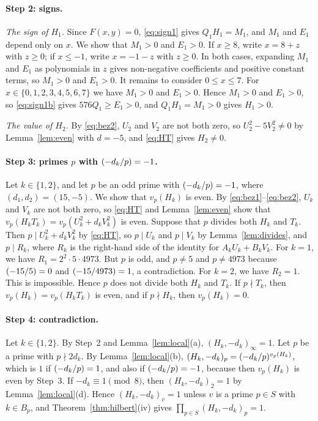 \documentclass[11pt]{article}
\newcommand{\leg}[2]{\mathchoice{\biggl(\dfrac{#1}{#2}\biggr)}{(#1/#2)}{(#1/#2)}{(#1/#2)}}
\begin{document}
\paragraph{Step 2: signs.} \emph{The sign of $H_{1}$.} Since $F(x,y)=0$, \eqref{eq:sign1} gives $Q_{1}H_{1}=M_{1}$, and $M_{1}$ and $E_{1}$ depend only on $x$. We show that $M_{1}>0$ and $E_{1}>0$. If $x\geq8$, write $x=8+z$ with $z\geq0$; if $x\leq-1$, write $x=-1-z$ with $z\geq0$. In both cases, expanding $M_{1}$ and $E_{1}$ as polynomials in $z$ gives non-negative coefficients and positive constant terms, so $M_{1}>0$ and $E_{1}>0$. It remains to consider $0\leq x\leq7$. For $x\in\{0,1,2,3,4,5,6,7\}$ we have $M_{1}>0$ and $E_{1}>0$. Hence $M_{1}>0$ and $E_{1}>0$, so \eqref{eq:sign1b} gives $576Q_{1}\geq E_{1}>0$, and $Q_{1}H_{1}=M_{1}>0$ gives $H_{1}>0$.

\emph{The value of $H_{2}$.} By \eqref{eq:bez2}, $U_{2}$ and $V_{2}$ are not both zero, so $U_{2}^2-5V_{2}^2\neq0$ by Lemma~\ref{lem:even} with $d=-5$, and \eqref{eq:HT} gives $H_{2}\neq0$.

\paragraph{Step 3: primes $p$ with $\leg{-d_k}{p}=-1$.} Let $k\in\{1,2\}$, and let $p$ be an odd prime with $\leg{-d_k}{p}=-1$, where $(d_{1},d_{2})=(15,-5)$. We show that $v_p(H_k)$ is even. By \eqref{eq:bez1}--\eqref{eq:bez2}, $U_k$ and $V_k$ are not both zero, so \eqref{eq:HT} and Lemma~\ref{lem:even} show that $v_p(H_kT_k)=v_p(U_k^2+d_kV_k^2)$ is even. Suppose that $p$ divides both $H_k$ and $T_k$. Then $p\mid U_k^2+d_kV_k^2$ by \eqref{eq:HT}, so $p\mid U_k$ and $p\mid V_k$ by Lemma~\ref{lem:divides}, and $p\mid R_k$, where $R_k$ is the right-hand side of the identity for $A_kU_k+B_kV_k$. For $k=1$, we have $R_{1}=2^{2}\cdot 5\cdot 4973$. But $p$ is odd, and $p\neq5$ and $p\neq4973$ because $\leg{-15}{5}=0$ and $\leg{-15}{4973}=1$, a contradiction. For $k=2$, we have $R_{2}=1$. This is impossible. Hence $p$ does not divide both $H_k$ and $T_k$. If $p\nmid T_k$, then $v_p(H_k)=v_p(H_kT_k)$ is even, and if $p\nmid H_k$, then $v_p(H_k)=0$.

\paragraph{Step 4: contradiction.} Let $k\in\{1,2\}$. By Step~2 and Lemma~\ref{lem:local}(a), $(H_k,-d_k)_\infty=1$. Let $p$ be a prime with $p\nmid2d_k$. By Lemma~\ref{lem:local}(b), $(H_k,-d_k)_p=\leg{-d_k}{p}^{v_p(H_k)}$, which is $1$ if $\leg{-d_k}{p}=1$, and also if $\leg{-d_k}{p}=-1$, because then $v_p(H_k)$ is even by Step~3. If $-d_k\equiv1\pmod8$, then $(H_k,-d_k)_2=1$ by Lemma~\ref{lem:local}(d). Hence $(H_k,-d_k)_v=1$ unless $v$ is a prime $p\in S$ with $k\in B_p$, and Theorem~\ref{thm:hilbert}(iv) gives $\prod_{p\in S}(H_k,-d_k)_p=1$.
\end{document}
